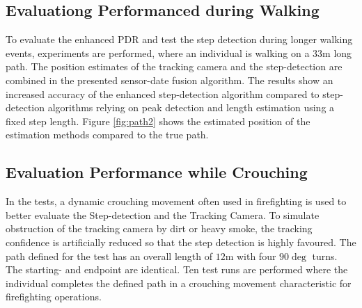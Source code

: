 \documentclass[engproc,conferenceproceedings,submit,pdftex,moreauthors]{Definitions/mdpi}
\begin{document}
\subsection{Evaluationg Performanced during Walking}

To evaluate the enhanced PDR and test the step detection during longer walking events, experiments are performed, where an individual is walking on a $33\mathrm{m}$ long path. The position estimates of the tracking camera and the step-detection are combined in the presented sensor-date fusion algorithm.
The results show an increased accuracy of the enhanced step-detection algorithm compared to step-detection algorithms relying on peak detection and length estimation using a fixed step length. Figure \ref{fig:path2} shows the estimated position of the estimation methods compared to the true path.

\subsection{Evaluation Performance while Crouching} 

In the tests, a dynamic crouching movement often used in firefighting is used to better evaluate the Step-detection and the Tracking Camera. To simulate obstruction of the tracking camera by dirt or heavy smoke, the tracking confidence is artificially reduced so that the step detection is highly favoured. The path defined for the test has an overall length of $12\mathrm{m}$ with four $90\deg$ turns. The starting- and endpoint are identical. Ten test runs are performed where the individual completes the defined path in a crouching movement characteristic for firefighting operations. \\
\end{document}
